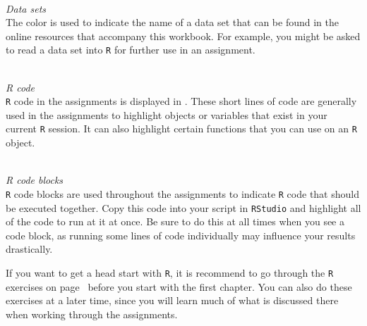  \\ 

\bigskip

\textit{Data sets} \\

The color  is used to indicate the name of a data set that can be found in the online resources that accompany this workbook. For example, you might be asked to read a data set into \texttt{R} for further use in an assignment. \\

 \\

\bigskip 

\textit{R code} \\ 

\texttt{R} code in the assignments is displayed in . These short lines of code are generally used in the assignments to highlight objects or variables that exist in your current \texttt{R} session. It can also highlight certain functions that you can use on an \texttt{R} object. \\

 \\ 

\bigskip

\textit{R code blocks} \\ 

\texttt{R} code blocks are used throughout the assignments to indicate \texttt{R} code that should be executed together. Copy this code into your script in \texttt{RStudio} and highlight all of the code to run at it at once. Be sure to do this at all times when you see a code block, as running some lines of code individually may influence your results drastically. \\


\bigskip
\bigskip

If you want to get a head start with \texttt{R}, it is recommend to go through the \texttt{R} exercises on page~\pageref{rexercises} before you start with the first chapter. You can also do these exercises at a later time, since you will learn much of what is discussed there when working through the assignments.

\clearpage %
